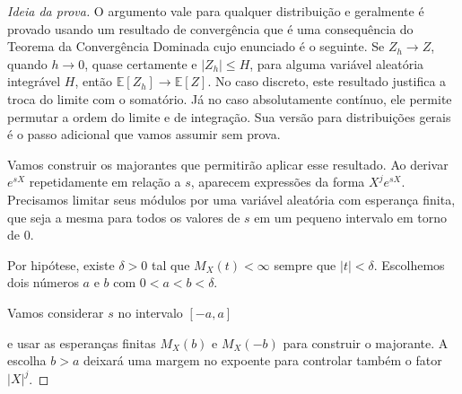 \documentclass[12pt,portuguese]{article}
\theoremstyle{definition}
\theoremstyle{plainexercise}
\theoremstyle{starredexercise}
\theoremstyle{definition}
\begin{document}
\begin{proof}[Ideia da prova]
O argumento vale para qualquer distribuição e geralmente é provado usando um resultado de
convergência que é uma consequência do Teorema da Convergência Dominada cujo enunciado é o seguinte. 
Se $Z_h\to Z$, quando $h\to 0$, quase certamente e $|Z_h|\leqslant H$, para alguma variável aleatória 
integrável $H$, então $\mathbb{E}[Z_h]\to\mathbb{E}[Z]$. 
No caso discreto, este resultado justifica a troca do limite com o somatório. 
Já no caso absolutamente contínuo, ele permite permutar a ordem do limite e de integração.
Sua versão para distribuições gerais é o passo adicional que vamos assumir sem prova.

Vamos construir os majorantes que permitirão aplicar esse resultado.
Ao derivar $e^{sX}$ repetidamente em relação a $s$, aparecem expressões
da forma $X^j e^{sX}$. Precisamos limitar seus módulos por uma variável
aleatória com esperança finita, que seja a mesma para todos os valores
de $s$ em um pequeno intervalo em torno de $0$.

Por hipótese, existe $\delta>0$ tal que $M_X(t)<\infty$ sempre que
$|t|<\delta$. Escolhemos dois números $a$ e $b$ com
$0<a<b<\delta$. 

\bigskip 

\begin{center}
\end{center}

Vamos considerar $s$ no intervalo $[-a,a]$ 
\begin{center}
\end{center}
e usar as esperanças finitas $M_X(b)$ e $M_X(-b)$ para construir o majorante.
A escolha $b>a$ deixará uma margem no expoente para controlar também
o fator $|X|^j$.



\end{proof}
\end{document}
